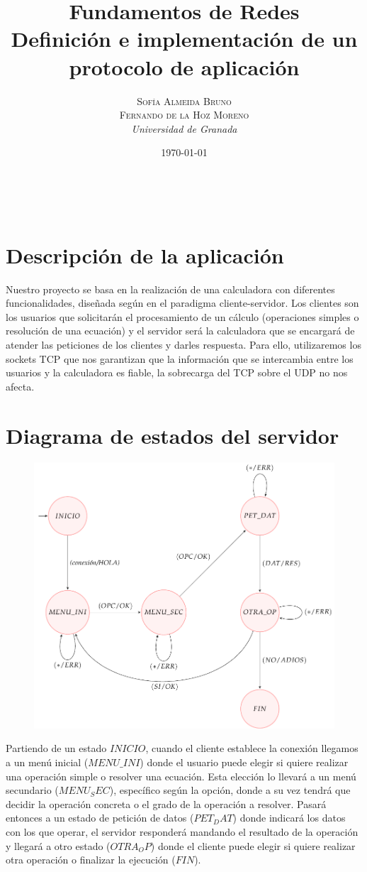 \documentclass[a4paper, 11pt]{article}
\title{\textbf{Fundamentos de Redes}\\ %
Definición e implementación de un protocolo de aplicación} %
\author{\textsc{Sofía Almeida Bruno\\Fernando de la Hoz Moreno} %
\\{\textit{Universidad de Granada}}} %
\date{\today} %
\makeatletter
\theoremstyle{plain}
\renewcommand{\maketitle}{
  \begin{flushright} %
  
  {\LARGE\@title} %
  
  \vspace{50pt} %
  
  {\large\@author} %
  \\\@date %
  \vspace{40pt} %
  \end{flushright}
}
\makeatother
\begin{document}
\maketitle %
\section{Descripción de la aplicación}
Nuestro proyecto se basa en la realización de una calculadora con diferentes funcionalidades, diseñada según en el paradigma cliente-servidor.
Los clientes son los usuarios que solicitarán el procesamiento de un cálculo (operaciones simples o resolución de una ecuación) y el servidor será la calculadora que se encargará de atender las peticiones de los clientes y darles respuesta.
Para ello, utilizaremos los sockets TCP que nos garantizan que la información que se intercambia entre los usuarios y la calculadora es fiable, la sobrecarga del TCP sobre el UDP no nos afecta.

\section{Diagrama de estados del servidor}
	\begin{figure}[!h]
		\centering
		\includegraphics[scale=0.7]{./diagrama}
	\end{figure}

Partiendo de un estado $INICIO$, cuando el cliente establece la conexión llegamos a un menú inicial ($MENU\_INI$) donde el usuario puede elegir si quiere realizar una operación simple o resolver una ecuación. Esta elección lo llevará a un menú secundario ($MENU_SEC$), específico según la opción, donde a su vez tendrá que decidir la operación concreta o el grado de la operación a resolver. Pasará entonces a un estado de petición de datos ($PET_DAT$) donde indicará los datos con los que operar, el servidor responderá mandando el resultado de la operación y llegará a otro estado ($OTRA_OP$) donde el cliente puede elegir si quiere realizar otra operación o finalizar la ejecución ($FIN$). 
\end{document}
